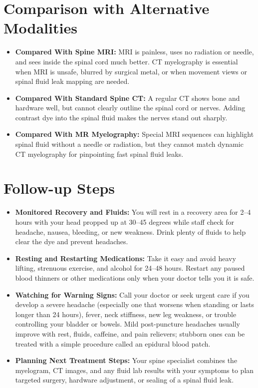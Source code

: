 \section{Comparison with Alternative Modalities}
\begin{itemize}
    \item \textbf{Compared With Spine MRI:} MRI is painless, uses no radiation or needle, and sees inside the spinal cord much better. CT myelography is essential when MRI is unsafe, blurred by surgical metal, or when movement views or spinal fluid leak mapping are needed.
    \item \textbf{Compared With Standard Spine CT:} A regular CT shows bone and hardware well, but cannot clearly outline the spinal cord or nerves. Adding contrast dye into the spinal fluid makes the nerves stand out sharply.
    \item \textbf{Compared With MR Myelography:} Special MRI sequences can highlight spinal fluid without a needle or radiation, but they cannot match dynamic CT myelography for pinpointing fast spinal fluid leaks.
\end{itemize}

\section{Follow-up Steps}
\begin{itemize}
    \item \textbf{Monitored Recovery and Fluids:} You will rest in a recovery area for 2--4 hours with your head propped up at 30--45 degrees while staff check for headache, nausea, bleeding, or new weakness. Drink plenty of fluids to help clear the dye and prevent headaches.
    \item \textbf{Resting and Restarting Medications:} Take it easy and avoid heavy lifting, strenuous exercise, and alcohol for 24--48 hours. Restart any paused blood thinners or other medications only when your doctor tells you it is safe.
    \item \textbf{Watching for Warning Signs:} Call your doctor or seek urgent care if you develop a severe headache (especially one that worsens when standing or lasts longer than 24 hours), fever, neck stiffness, new leg weakness, or trouble controlling your bladder or bowels. Mild post-puncture headaches usually improve with rest, fluids, caffeine, and pain relievers; stubborn ones can be treated with a simple procedure called an epidural blood patch.
    \item \textbf{Planning Next Treatment Steps:} Your spine specialist combines the myelogram, CT images, and any fluid lab results with your symptoms to plan targeted surgery, hardware adjustment, or sealing of a spinal fluid leak.
\end{itemize}


